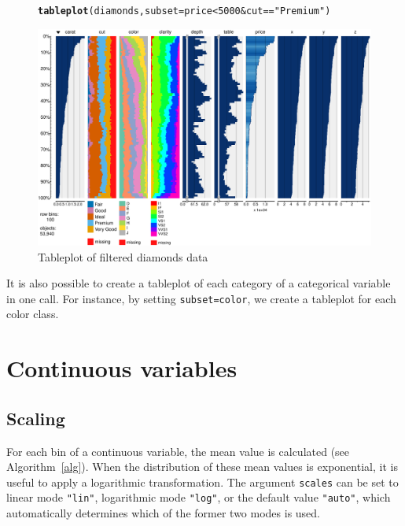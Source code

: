 \documentclass[11pt, fleqn, a4paper]{article}\usepackage{graphicx, color}
\makeatletter
\def\maxwidth{ %
  \ifdim\Gin@nat@width>\linewidth
    \linewidth
  \else
    \Gin@nat@width
  \fi
}
\newcommand{\hlfunctioncall}[1]{\textcolor[rgb]{0.501960784313725,0,0.329411764705882}{\textbf{#1}}}%
\newcommand{\hlstring}[1]{\textcolor[rgb]{0.6,0.6,1}{#1}}%
\newenvironment{kframe}{%
 \def\FrameCommand##1{\hskip\@totalleftmargin \hskip-\fboxsep
 \colorbox{shadecolor}{##1}\hskip-\fboxsep
     \hskip-\linewidth \hskip-\@totalleftmargin \hskip\columnwidth}%
 \MakeFramed {\advance\hsize-\width
   \@totalleftmargin\z@ \linewidth\hsize
   \@setminipage}}%
 {\par\unskip\endMakeFramed}
\newenvironment{knitrout}{}{} %
\makeatother
\begin{document}
\begin{figure}[!htp]
\begin{knitrout}
\color{fgcolor}\begin{kframe}
\begin{alltt}
\hlfunctioncall{tableplot}(diamonds, subset = price < 5000 & cut == \hlstring{"Premium"})
\end{alltt}
\end{kframe}\includegraphics[width=\maxwidth]{figure/chunk7} 
\end{knitrout}

\vspace{-2em}
\caption{Tableplot of filtered diamonds data}
\label{fig:tp5}
\end{figure}

It is also possible to create a tableplot of each category of a categorical variable in one call. For instance, by setting {\tt subset=color}, we create a tableplot for each color class.

\clearpage

\section{Continuous variables}

\subsection{Scaling}
For each bin of a continuous variable, the mean value is calculated (see Algorithm~\ref{alg}).
When the distribution of these mean values is exponential, it is useful to apply a logarithmic transformation. The argument {\tt scales} can be set to linear mode {\tt "lin"}, logarithmic mode {\tt "log"}, or the default value {\tt "auto"}, which automatically determines which of the former two modes is used.
\end{document}
